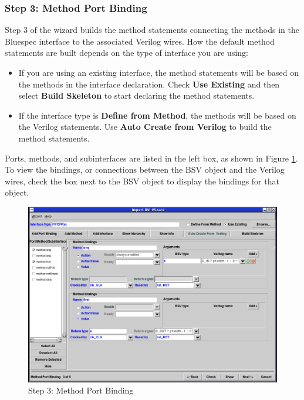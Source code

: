 \documentclass{article}
\begin{document}

\subsubsection{Step 3: Method Port Binding}

Step 3 of the  wizard builds the method statements  connecting
the methods in the Bluespec interface to the associated Verilog wires.
How the default method statements are built depends on the type of
interface you are using:
\begin{itemize}
\item If you are using an existing interface,  the method
statements will be based on the methods in the interface declaration.
Check  {\bf Use Existing} and then   select {\bf Build Skeleton} to
start declaring the method statements.
\item If the interface type is {\bf Define from Method}, the methods will be
based on the Verilog statements.  Use
{\bf Auto Create from Verilog} to build the method statements.
\end{itemize}

 Ports, methods, and subinterfaces  are listed in the left
box, as shown in Figure \ref{fig-importbvi3}.  To view the  bindings, or connections between the BSV object
and the Verilog wires,  check the box next to the BSV object to
display the bindings for that object.


\begin{figure}[htbp]
\begin{center}
\includegraphics[width = 5 in]{figures/importbvi3}
\caption{Step 3: Method Port Binding }
\label{fig-importbvi3}
\end{center}
\end{figure}
\end{document}
